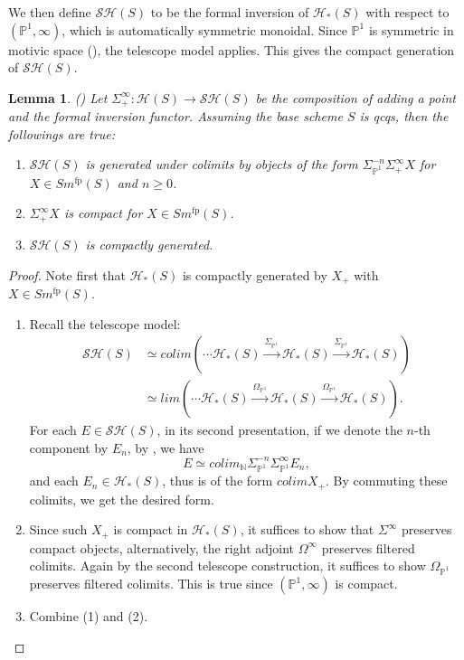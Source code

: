 \documentclass{article}
\newtheorem{lm}[thm]{Lemma}
\theoremstyle{definition}
\newcommand{\on}{\operatorname}
\begin{document}
We then define $\mathcal{SH}(S)$ to be the formal inversion of $\mathcal{H}_\ast(S)$ with respect to $(\mathbb{P}^1,\infty)$, which is automatically symmetric monoidal. Since $\mathbb{P}^1$ is symmetric in motivic space (\cite[Theorem 4.3, Lemma 4.4]{Voe}), the telescope model applies. This gives the compact generation of $\mathcal{SH}(S)$.
\begin{lm}(\cite[Proposition C.12]{Hoy})
Let $\Sigma^\infty_+ : \mathcal{H}(S)\rightarrow \mathcal{SH}(S)$ be the composition of adding a point and the formal inversion functor. Assuming the base scheme $S$ is qcqs, then the followings are true:
\begin{enumerate}
\item $\mathcal{SH}(S)$ is generated under colimits by objects of the form $\Sigma^{-n}_{\mathbb{P}^1}\Sigma^\infty_+X$ for $X\in Sm^{\on{fp}}(S)$ and $n\geq 0$.
\item $\Sigma^\infty_+X$ is compact for $X\in Sm^{\on{fp}}(S)$.
\item $\mathcal{SH}(S)$ is compactly generated.
\end{enumerate}
\end{lm}
\begin{proof}
Note first that $\mathcal{H}_\ast(S)$ is compactly generated by $X_+$ with $X\in Sm^{\on{fp}}(S)$.
\begin{enumerate}
\item Recall the telescope model: \[
\begin{aligned}
\mathcal{SH}(S)&\simeq colim (\cdots\mathcal{H}_\ast(S)\xrightarrow{\Sigma_{\mathbb{P}^1}}\mathcal{H}_\ast(S)\xrightarrow{\Sigma_{\mathbb{P}^1}}\mathcal{H}_\ast(S))\\
&\simeq lim (\cdots\mathcal{H}_\ast(S)\xrightarrow{\Omega_{\mathbb{P}^1}}\mathcal{H}_\ast(S)\xrightarrow{\Omega_{\mathbb{P}^1}}\mathcal{H}_\ast(S)).
\end{aligned}\]
For each $E\in\mathcal{SH}(S)$, in its second presentation, if we denote the $n$-th component by $E_n$, by \cite[lemma 6.3.3.6]{HA}, we have\[
E\simeq colim_\mathbb{N}\Sigma^{-n}_{\mathbb{P}^1}\Sigma^\infty_{\mathbb{P}^1}E_n,
\]
and each $E_n\in\mathcal{H}_\ast(S)$, thus is of the form $colim X_+$. By commuting these colimits, we get the desired form.
\item Since such $X_+$ is compact in $\mathcal{H}_\ast(S)$, it suffices to show that $\Sigma^\infty$ preserves compact objects, alternatively, the right adjoint $\Omega^\infty$ preserves filtered colimits. Again by the second telescope construction, it suffices to show $\Omega_{\mathbb{P}^1}$ preserves filtered colimits. This is true since $(\mathbb{P}^1,\infty)$ is compact.
\item Combine (1) and (2).
\end{enumerate}
\end{proof}
\end{document}
